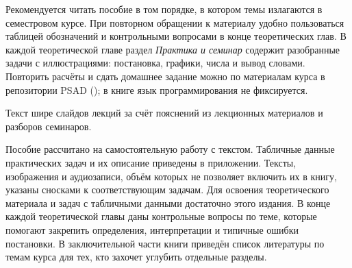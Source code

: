 Рекомендуется читать пособие в том порядке, в котором темы излагаются в семестровом курсе.
При повторном обращении к материалу удобно пользоваться таблицей обозначений и контрольными вопросами в конце теоретических глав.
В каждой теоретической главе раздел \emph{Практика и семинар} содержит разобранные задачи с иллюстрациями: постановка, графики, числа и вывод словами.
Повторить расчёты и сдать домашнее задание можно по материалам курса в репозитории PSAD (\PSADRepo{}); в книге язык программирования не фиксируется.

Текст шире слайдов лекций за счёт пояснений из лекционных материалов и разборов семинаров.

Пособие рассчитано на самостоятельную работу с текстом.
Табличные данные практических задач и их описание приведены в приложении.
Тексты, изображения и аудиозаписи, объём которых не позволяет включить их в книгу, указаны сносками к соответствующим задачам.
Для освоения теоретического материала и задач с табличными данными достаточно этого издания.
В конце каждой теоретической главы даны контрольные вопросы по теме, которые помогают закрепить определения, интерпретации и типичные ошибки постановки.
В заключительной части книги приведён список литературы по темам курса для тех, кто захочет углубить отдельные разделы.
